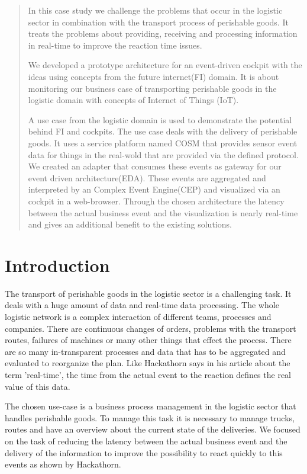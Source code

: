 \documentclass{acm_proc_article-sp}
\begin{document}
\maketitle
\begin{abstract}
In this case study we challenge the problems that occur in the logistic sector in combination with the transport process of perishable goods.
It treats the problems about providing, receiving and processing information in real-time to improve the reaction time issues.

We developed a prototype architecture for an event-driven cockpit with the ideas using concepts from the future internet(FI) domain. It is about monitoring our business case of transporting perishable goods in the logistic domain with concepts of Internet of Things (IoT). 

A use case from the logistic domain is used to demonstrate the potential behind FI and cockpits. The use case deals with the delivery of perishable goods.
It uses a service platform named COSM that provides sensor event data for things in the real-wold that are provided via the defined protocol.
We created an adapter that consumes these events as gateway for our event driven architecture(EDA).
These events are aggregated and interpreted by an Complex Event Engine(CEP) and visualized via an cockpit in a web-browser.
Through the chosen architecture the latency between the actual business event and the visualization is nearly real-time and gives an additional benefit to the existing solutions.
\end{abstract}


\section{Introduction}
The transport of perishable goods in the logistic sector is a challenging task. It deals with a huge amount of data and real-time data processing.
The whole logistic network is a complex interaction of different teams, processes and companies.
There are continuous changes of orders, problems with the transport routes, failures of machines or many other things that effect the process.
There are so many in-transparent processes and data that has to be aggregated and evaluated to reorganize the plan.
Like Hackathorn says in his article about the term 'real-time', the time from the actual event to the reaction defines the real value of this data\cite{Hackathorn:real_time_to_real_value}.

The chosen use-case is a business process management in the logistic sector that handles  perishable goods. To manage this task it is necessary to manage trucks, routes and have an overview about the current state of the deliveries. We focused on the task of reducing the latency between the actual business event and the delivery of the information to improve the possibility to react quickly to this events as shown by Hackathorn\cite{Hackathorn:real_time_to_real_value}.
\end{document}
